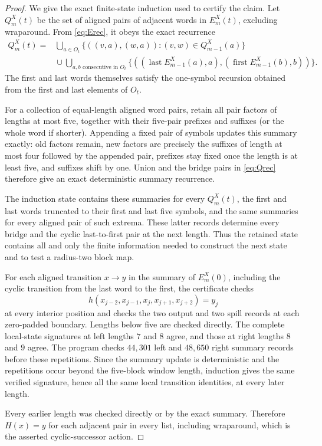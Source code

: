 \documentclass[11pt]{article}
\theoremstyle{remark}
\begin{document}
\begin{proof}
We give the exact finite-state induction used to certify the claim.  Let
$Q_m^X(t)$ be the set of aligned pairs of adjacent words in $E_m^X(t)$,
excluding wraparound.  From \eqref{eq:Erec}, it obeys the exact recurrence
\begin{equation}\label{eq:Qrec}
\begin{split}
Q_m^X(t)={}&\bigcup_{a\in O_t}
 \{((v,a),(w,a)):(v,w)\in Q_{m-1}^X(a)\}\\
&{}\cup\bigcup_{a,b\text{ consecutive in }O_t}
 \{((\operatorname{last}E_{m-1}^X(a),a),
    (\operatorname{first}E_{m-1}^X(b),b))\}.
\end{split}
\end{equation}
The first and last words themselves satisfy the one-symbol recursion obtained
from the first and last elements of $O_t$.

For a collection of equal-length aligned word pairs, retain all pair factors
of lengths at most five, together with their five-pair prefixes and suffixes
(or the whole word if shorter).  Appending a fixed pair of symbols updates
this summary exactly: old factors remain, new factors are precisely the
suffixes of length at most four followed by the appended pair, prefixes stay
fixed once the length is at least five, and suffixes shift by one.  Union and
the bridge pairs in \eqref{eq:Qrec} therefore give an exact deterministic
summary recurrence.

The induction state contains these summaries for every $Q_m^X(t)$, the
first and last words truncated to their first and last five symbols, and the
same summaries for every aligned pair of such extrema.  These latter records
determine every bridge and the cyclic last-to-first pair at the next length.
Thus the retained state contains all and only the finite information needed
to construct the next state and to test a radius-two block map.

For each aligned transition $x\to y$ in the summary of $E_m^X(0)$, including
the cyclic transition from the last word to the first, the certificate checks
\[
 h(x_{j-2},x_{j-1},x_j,x_{j+1},x_{j+2})=y_j
\]
at every interior position and checks the two output and two spill records at
each zero-padded boundary.  Lengths below five are checked directly.  The
complete local-state signatures at left lengths $7$ and $8$ agree, and those
at right lengths $8$ and $9$ agree.  The program checks $44{,}301$ left and
$48{,}650$ right summary records before these repetitions.  Since the summary
update is deterministic and the repetitions occur beyond the five-block
window length, induction gives the same verified signature, hence all the
same local transition identities, at every later length.

Every earlier length was checked directly or by the exact summary.  Therefore
$H(x)=y$ for each adjacent pair in every list, including wraparound, which is
the asserted cyclic-successor action.
\end{proof}
\end{document}
